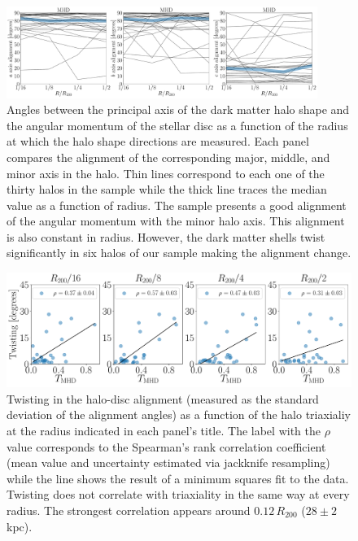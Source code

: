 \documentclass[usenatbib]{mnras}
\begin{document}
\begin{figure}
\begin{center}
\includegraphics[width=0.9\textwidth]{angles_alignment_MHD.pdf}
\end{center}
\caption{Angles between the principal axis of the dark matter halo
  shape and the angular momentum of the stellar disc 
  as a function of the radius at
  which the halo shape directions are measured.
  Each panel compares the alignment of the corresponding
  major, middle, and minor axis in the halo.
  Thin lines correspond to each one of the thirty halos in the sample
  while the thick line traces the median value as a function of  radius.
  The sample presents a good alignment of the angular
  momentum with the minor halo axis. 
  This alignment is also constant in radius.
  However, the dark matter shells twist significantly in six halos 
  of our sample making the alignment change. 
}
\label{fig:cumulative_alignment}
\end{figure}


\begin{figure}
\begin{center}
\includegraphics[width=1.0\textwidth]{correlations_twisting_triaxiality_MHD.pdf}
\end{center}
\caption{Twisting in the halo-disc alignment (measured as the standard deviation of the alignment angles)
  as a function of the halo triaxialiy at the radius indicated
  in each panel's title.
  The label with the $\rho$ value corresponds to the Spearman's rank
  correlation coefficient (mean value and uncertainty estimated via
  jackknife resampling) while the line shows the result of a
  minimum squares fit to the data.
  Twisting does not correlate with triaxiality in the same way at every
  radius. The strongest correlation appears around $0.12\, R_{200}$ ($28\pm2$ kpc).} 
\label{fig:alignment_correlations}
\end{figure}
\end{document}
